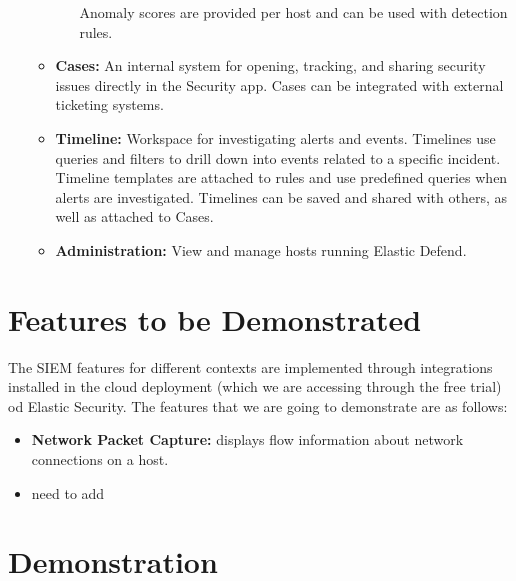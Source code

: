 \documentclass{report}
\begin{document}
\begin{itemize}
\begin{itemize}
\begin{itemize}
			Anomaly scores are provided per host and can be used with detection rules.
		\end{itemize}
		\item \textbf{Cases:} An internal system for opening, tracking, and sharing security issues directly in the Security app. 
		Cases can be integrated with external ticketing systems.
		\item \textbf{Timeline:} Workspace for investigating alerts and events. 
		Timelines use queries and filters to drill down into events related to a specific incident.
		Timeline templates are attached to rules and use predefined queries when alerts are investigated.
		Timelines can be saved and shared with others, as well as attached to Cases.
		\item \textbf{Administration:} View and manage hosts running Elastic Defend.
	\end{itemize}
\end{itemize}

\chapter{Features to be Demonstrated}
The SIEM features for different contexts are implemented through integrations installed in the cloud deployment 
(which we are accessing through the free trial) od Elastic Security.
The features that we are going to demonstrate are as follows:
\begin{itemize}
	\item \textbf{Network Packet Capture:} displays flow information about network connections on a host.
	\item need to add
\end{itemize}

\chapter{Demonstration}
\end{document}
